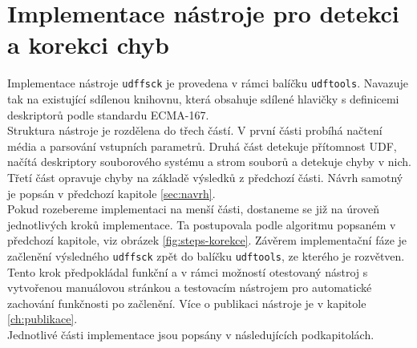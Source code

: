 \section{Implementace nástroje pro detekci a korekci chyb}
\label{sec:implementace}
Implementace nástroje \texttt{udffsck} je provedena v rámci balíčku \texttt{udftools}. Navazuje tak na existující sdílenou knihovnu, která obsahuje sdílené hlavičky s definicemi deskriptorů podle standardu ECMA-167.\\
Struktura nástroje je rozdělena do třech částí. V první části probíhá načtení média a parsování vstupních parametrů. Druhá část detekuje přítomnost UDF, načítá deskriptory souborového systému a strom souborů a detekuje chyby v nich. Třetí část opravuje chyby na základě výsledků z předchozí části. Návrh samotný je popsán v předchozí kapitole \ref{sec:navrh}.\\
Pokud rozebereme implementaci na menší části, dostaneme se již na úroveň jednotlivých kroků implementace. Ta postupovala podle algoritmu popsaném v předchozí kapitole, viz obrázek \ref{fig:steps-korekce}.
Závěrem implementační fáze je začlenění výsledného \texttt{udffsck} zpět do balíčku \texttt{udftools}, ze kterého je rozvětven. Tento krok předpokládal funkční a v rámci možností otestovaný nástroj s vytvořenou manuálovou stránkou a testovacím nástrojem pro automatické zachování funkčnosti po začlenění. Více o publikaci nástroje je v kapitole \ref{ch:publikace}.\\
Jednotlivé části implementace jsou popsány v následujících podkapitolách.

